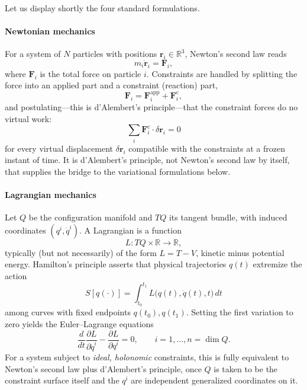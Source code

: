 Let us display shortly the four standard formulations.

\paragraph{Newtonian mechanics}
For a system of $N$ particles with positions $\bm{r}_i \in \mathbb{R}^3$,
Newton's second law reads 
\[m_i \ddot{\bm{r}}_i = \bm{F}_i,\]
where $\bm{F}_i$ is the total force on particle $i$. Constraints are handled by
splitting the force into an applied part and a constraint (reaction) part,
\[\bm{F}_i = \bm{F}_i^{\mathrm{app}} + \bm{F}_i^{\mathrm{c}},\]
and postulating---this is d'Alembert's principle---that the constraint forces 
do no virtual work: 
\[\sum_i \bm{F}_i^{\mathrm{c}}\cdot \delta \bm{r}_i = 0\]
for every virtual displacement $\delta\bm{r}_i$ compatible with the
constraints at a frozen instant of time. It is d'Alembert's principle, not
Newton's second law by itself, that supplies the bridge to the variational
formulations below.

\paragraph{Lagrangian mechanics}
Let $Q$ be the configuration manifold and $TQ$ its tangent bundle, with induced
coordinates $(q^i,\dot q^i)$. A Lagrangian is a function 
\[L : TQ \times \mathbb{R} \to \mathbb{R},\]
typically (but not necessarily) of the form $L = T- V$, 
kinetic minus potential energy. Hamilton's principle asserts that
physical trajectories $q(t)$ extremize the action
\begin{equation}
S[q(\cdot)] = \int_{t_0}^{t_1} L\big(q(t),\dot q(t), t\big)\, dt
\end{equation}
among curves with fixed endpoints $q(t_0), q(t_1)$. Setting the first variation
to zero yields the Euler--Lagrange equations
\begin{equation}
\label{EL}
\frac{d}{dt}\frac{\partial L}{\partial\dot q^i} - \frac{\partial L}{\partial q^i} = 0 ,
    \qquad i = 1,\dots,n=\dim Q .
\end{equation}
For a system subject to \emph{ideal, holonomic} constraints, this is fully
equivalent to Newton's second law plus d'Alembert's principle, once $Q$ is
taken to be the constraint surface itself and the $q^i$ are independent
generalized coordinates on it.

